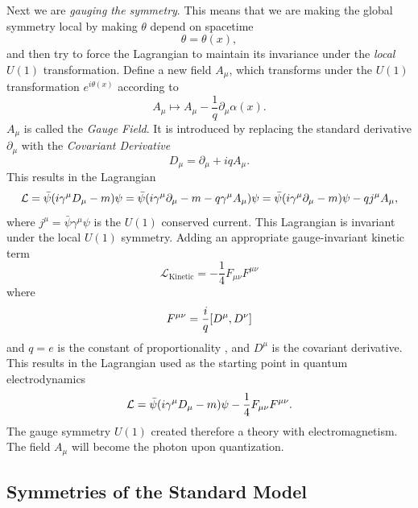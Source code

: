 Next we are \emph{gauging the symmetry}. This means that we are making the global symmetry local by making $\theta$ depend on spacetime
\begin{equation}
\theta=\theta(x),
\end{equation}
and then try to force the Lagrangian to maintain its invariance under the \emph{local} $U(1)$ transformation. Define a new field $A_{\mu}$, which transforms under the $U(1)$ transformation $e^{i\theta(x)}$ according to
\begin{equation}
A_\mu\mapsto A_\mu-\frac{1}{q}\partial_{\mu}\alpha(x).
\end{equation}
$A_{\mu}$ is called the \emph{Gauge Field}. It is introduced by replacing the standard derivative $\partial_{\mu}$ with the \emph{Covariant Derivative}
\begin{equation}
D_{\mu}=\partial_{\mu}+iqA_{\mu}.
\end{equation}
This results in the Lagrangian
\begin{equation}
\mathcal{L}=\bar{\psi}\qty(i\gamma^{\mu}D_{\mu}-m)\psi=\bar{\psi}\qty(i\gamma^{\mu}\partial_{\mu}-m-q\gamma^{\mu}A_{\mu})\psi=\bar{\psi}\qty(i\gamma^{\mu}\partial_{\mu}-m)\psi-qj^{\mu}A_{\mu},
\end{equation}
where $j^{\mu}=\bar{\psi}\gamma^{\mu}\psi$ is the $U(1)$ conserved current. This Lagrangian is invariant under the local $U(1)$ symmetry. Adding an appropriate gauge-invariant kinetic term 
\begin{equation}
\mathcal{L}_{\textrm{Kinetic}}=-\frac{1}{4}F_{\mu\nu}F^{\mu\nu}
\end{equation}
where
\begin{equation}
F^{\mu\nu}=\frac{i}{q}\comm{D^\mu}{D^\nu}
\end{equation}
and $q=e$ is the constant of proportionality , and $D^\mu$ is the covariant derivative. This results in the Lagrangian used as the starting point in quantum electrodynamics
\begin{equation}
\mathcal{L}=\bar{\psi}\qty(i\gamma^{\mu}D_{\mu}-m)\psi-\frac{1}{4}F_{\mu\nu}F^{\mu\nu}.
\end{equation}
The gauge symmetry $U(1)$ created therefore a theory with electromagnetism. The field $A_{\mu}$ will become the photon upon quantization.

\subsection{Symmetries of the Standard Model}
\label{symmetries-of-the-standard-model}

